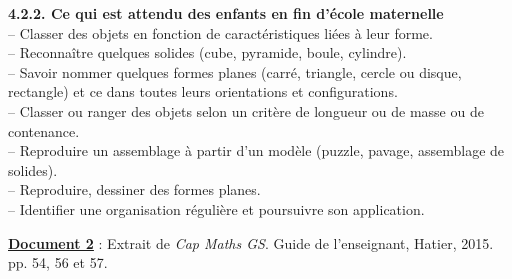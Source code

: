 \begin{center}
   \begin{minipage}{16cm}
      \textsf{{\bf 4.2.2. Ce qui est attendu des enfants en fin d’école maternelle} \\ [1mm]
      -- Classer des objets en fonction de caractéristiques liées à leur forme. \\
      -- Reconnaître quelques solides (cube, pyramide, boule, cylindre). \\
      -- Savoir nommer quelques formes planes (carré, triangle, cercle ou disque, rectangle) et ce dans toutes leurs orientations et configurations. \\
      -- Classer ou ranger des objets selon un critère de longueur ou de masse ou de contenance. \\
      -- Reproduire un assemblage à partir d’un modèle (puzzle, pavage, assemblage de solides). \\
      -- Reproduire, dessiner des formes planes. \\
      -- Identifier une organisation régulière et poursuivre son application.}
   \end{minipage}
\end{center}

\bigskip


{\bf\uline{Document 2}} : Extrait de {\it Cap Maths GS}. Guide de l’enseignant, Hatier, 2015. pp. 54, 56 et 57. 

